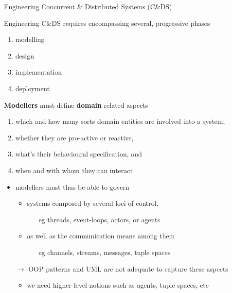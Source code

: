 \documentclass[presentation]{beamer}\mode<presentation>{\usetheme{AMSCesenaPurpleAndGold}}
\begin{document}
\begin{frame}[c,allowframebreaks]{Engineering Concurrent \& Distributed Systems (C\&DS)}

	Engineering C\&DS requires encompassing several, progressive phases
	\begin{enumerate}
		\item modelling
		\item design
		\item implementation
		\item deployment
	\end{enumerate}

	\framebreak

	\begin{block}{\textbf{Modellers} must define \textbf{domain}-related aspects}
		\begin{enumerate}
			\item which and how many sorts \alert{domain entities} are involved into a system,
			\item whether they are \alert{pro-active} or \alert{reactive},
			\item what's their \alert{behavioural specification}, and
			\item when and with whom they can \alert{interact}
		\end{enumerate}
	\end{block}

	\bigskip

	\begin{itemize}
		\item modellers must thus be able to govern
		\begin{itemize}
			\item systems composed by several \alert{loci of control},
			\begin{itemize}
				\item[eg] threads, event-loops, actors, or \alert{agents}
			\end{itemize}
		
			\item as well as the \alert{communication means} among them
			\begin{itemize}
				\item[eg] channels, streams, messages, \alert{tuple spaces}
			\end{itemize}
		\end{itemize}

		\bigskip

		\item[$\rightarrow$] OOP patterns and UML are not adequate to capture these aspects
		\begin{itemize}
			\item we need higher level notions such as \alert{agents}, \alert{tuple spaces}, etc
		\end{itemize}
	\end{itemize}


\end{frame}
\end{document}
